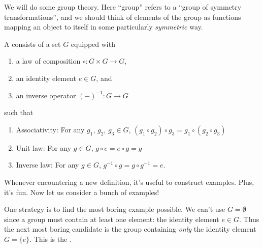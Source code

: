  We will do some group theory. Here ``group'' refers to
a ``group of symmetry transformations'', and we should think of elements
of the group as functions mapping an object to itself in some
particularly \emph{symmetric} way.

\begin{definition}
  A  consists of a set $G$ equipped with
  \begin{enumerate}
  \item a law of composition $\circ\colon G\times G\to G$,
  \item an identity element $e\in G$, and
  \item an inverse operator $(-)^{-1}\colon G\to G$
  \end{enumerate}
  such that
  \begin{enumerate}
  \item Associativity: For any $g_{1}$, $g_{2}$, $g_{3}\in G$, $(g_{1}\circ g_{2})\circ g_{3}=g_{1}\circ(g_{2}\circ g_{3})$
  \item Unit law: For any $g\in G$, $g\circ e=e\circ g=g$
  \item Inverse law: For any $g\in G$, $g^{-1}\circ g=g\circ g^{-1}=e$.
  \end{enumerate}
\end{definition}

 Whenever encountering
a new definition, it's useful to construct examples. Plus, it's fun. Now
let us consider a bunch of examples!

\begin{example}[Trivial]
One strategy is to find the most boring example possible. We can't use
$G=\emptyset$ since a group must contain at least one element: the
identity element $e\in G$. Thus the next most boring candidate is the
group containing \emph{only} the identity element $G=\{e\}$. This is the
.
\end{example}

